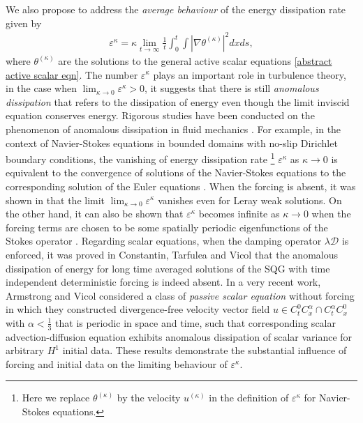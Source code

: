 \documentclass[reqno]{amsart}%
\theoremstyle{definition}
\theoremstyle{remark}
\numberwithin{equation}{section}
\newcommand{\1}{\mathbf{1}}
\numberwithin{equation}{section}
\numberwithin{theorem}{section}
\numberwithin{figure}{section}
\begin{document}
 We also propose to address the {\it average behaviour} of the energy dissipation rate given by
\begin{align*}
\varepsilon^{\kappa}=\kappa\lim_{t\to\infty}\frac{1}{t}\int_0^t\int|\nabla\theta^{(\kappa)}|^2dxds,
\end{align*}
where $\theta^{(\kappa)}$ are the solutions to the general active scalar equations \eqref{abstract active scalar eqn}. The number $\varepsilon^{\kappa}$ plays an important role in turbulence theory, in the case when $\lim_{\kappa\to0}\varepsilon^{\kappa}>0$, it suggests that there is still {\it anomalous dissipation} that refers to the dissipation of energy even though the limit inviscid equation conserves energy. Rigorous studies have been conducted on the phenomenon of anomalous dissipation in fluid mechanics \cite{Fr95, DF02, DN18, CCS23, EL24}. For example, in the context of Navier-Stokes equations in bounded domains with no-slip Dirichlet boundary conditions, the vanishing of energy dissipation rate \footnote{Here we replace $\theta^{(\kappa)}$ by the velocity $u^{(\kappa)}$ in the definition of $\varepsilon^{\kappa}$ for Navier-Stokes equations.} $\varepsilon^{\kappa}$ as $\kappa\to0$ is equivalent to the convergence of solutions of the Navier-Stokes equations to the corresponding solution of the Euler equations \cite{Ka83, Wa01}. When the forcing is absent, it was shown in \cite{CR07} that the limit $\lim_{\kappa\to0}\varepsilon^{\kappa}$ vanishes even for Leray weak solutions. On the other hand, it can also be shown that $\varepsilon^{\kappa}$ becomes infinite as $\kappa\to0$ when the forcing terms are chosen to be some spatially periodic eigenfunctions of the Stokes operator \cite{CTV14b}. Regarding scalar equations, when the damping operator $\lambda\mathcal{D}$ is enforced, it was proved in Constantin, Tarfulea and Vicol \cite{CTV14b} that the anomalous dissipation of energy for long time averaged solutions of the SQG with time independent deterministic forcing is indeed absent. In a very recent work, Armstrong and Vicol \cite{AV25} considered a class of {\it passive scalar equation} without forcing in which they constructed divergence-free velocity vector field $u\in C^0_t C^\alpha_x\cap C^\alpha_t C^0_x$ with $\alpha<\frac{1}{3}$ that is periodic in space and time, such that corresponding scalar
advection-diffusion equation exhibits anomalous dissipation of scalar variance for arbitrary $H^1$ initial data. These results demonstrate the substantial influence of forcing and initial data on the limiting behaviour of $\varepsilon^{\kappa}$. 
\end{document}
